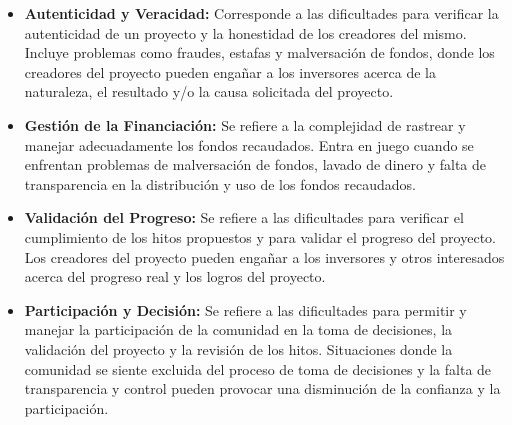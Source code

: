 \begin{itemize}
    \item \textbf{Autenticidad y Veracidad:} Corresponde a las dificultades para verificar la autenticidad de un proyecto y la honestidad de los creadores del mismo. Incluye problemas como fraudes, estafas y malversación de fondos, donde los creadores del proyecto pueden engañar a los inversores acerca de la naturaleza, el resultado y/o la causa solicitada del proyecto.
    
    \item \textbf{Gestión de la Financiación:} Se refiere a la complejidad de rastrear y manejar adecuadamente los fondos recaudados. Entra en juego cuando se enfrentan problemas de malversación de fondos, lavado de dinero y falta de transparencia en la distribución y uso de los fondos recaudados.
    
    \item \textbf{Validación del Progreso:} Se refiere a las dificultades para verificar el cumplimiento de los hitos propuestos y para validar el progreso del proyecto. Los creadores del proyecto pueden engañar a los inversores y otros interesados acerca del progreso real y los logros del proyecto.
    
    \item \textbf{Participación y Decisión:} Se refiere a las dificultades para permitir y manejar la participación de la comunidad en la toma de decisiones, la validación del proyecto y la revisión de los hitos. Situaciones donde la comunidad se siente excluida del proceso de toma de decisiones y la falta de transparencia y control pueden provocar una disminución de la confianza y la participación.
    
\end{itemize}